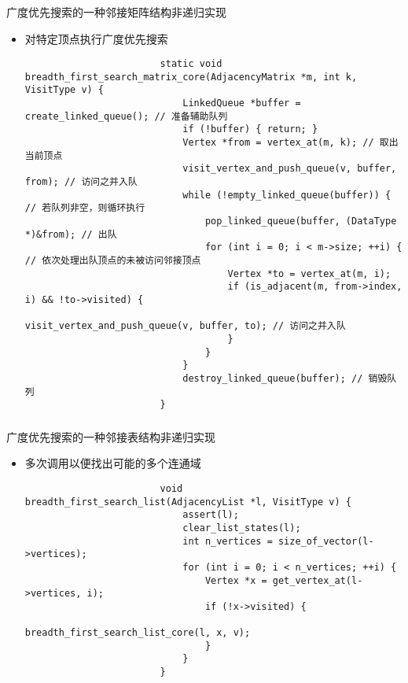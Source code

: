 \begin{fragile}
    \frametitle{\insertsubsectionhead}
    \begin{block}{广度优先搜索的一种\alert{邻接矩阵}结构非递归实现}
        \begin{itemize}
            \item 对特定顶点执行广度优先搜索
                    \begin{verbatim}
                        static void breadth_first_search_matrix_core(AdjacencyMatrix *m, int k, VisitType v) {
                            LinkedQueue *buffer = create_linked_queue(); // 准备辅助队列
                            if (!buffer) { return; }
                            Vertex *from = vertex_at(m, k); // 取出当前顶点
                            visit_vertex_and_push_queue(v, buffer, from); // 访问之并入队
                            while (!empty_linked_queue(buffer)) { // 若队列非空，则循环执行
                                pop_linked_queue(buffer, (DataType *)&from); // 出队
                                for (int i = 0; i < m->size; ++i) { // 依次处理出队顶点的未被访问邻接顶点
                                    Vertex *to = vertex_at(m, i);
                                    if (is_adjacent(m, from->index, i) && !to->visited) {
                                        visit_vertex_and_push_queue(v, buffer, to); // 访问之并入队
                                    }
                                }
                            }
                            destroy_linked_queue(buffer); // 销毁队列
                        }
                    \end{verbatim}
        \end{itemize}
    \end{block}
\end{fragile}

\begin{fragile}
    \frametitle{\insertsubsectionhead}
    \begin{block}{广度优先搜索的一种\alert{邻接表}结构非递归实现}
        \begin{itemize}
            \item 多次调用以便找出可能的多个连通域
                    \begin{verbatim}
                        void breadth_first_search_list(AdjacencyList *l, VisitType v) {
                            assert(l);
                            clear_list_states(l);
                            int n_vertices = size_of_vector(l->vertices);
                            for (int i = 0; i < n_vertices; ++i) {
                                Vertex *x = get_vertex_at(l->vertices, i);
                                if (!x->visited) {
                                    breadth_first_search_list_core(l, x, v);
                                }
                            }
                        }
                    \end{verbatim}
        \end{itemize}
    \end{block}
\end{fragile}

